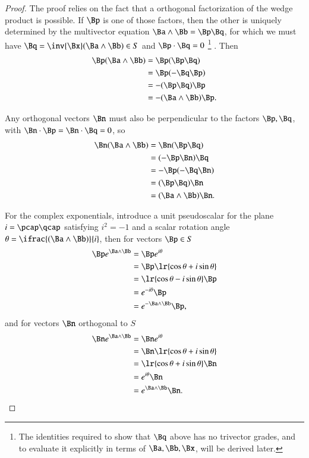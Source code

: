 \begin{proof}
The proof relies on the fact that a orthogonal factorization of the wedge product is possible.
If \( \Bp \) is one of those factors, then the other is uniquely determined by the multivector equation \( \Ba \wedge \Bb = \Bp \Bq \), for which we must have \( \Bq = \inv{\Bx}(\Ba \wedge \Bb) \in S \) and \( \Bp \cdot \Bq = 0 \)
\footnote{The identities required to show that \( \Bq \) above has no trivector grades, and to evaluate it explicitly in terms of \( \Ba, \Bb, \Bx \), will be derived later.}
.
Then
\begin{equation}\label{eqn:generalRotation:1780}
\begin{aligned}
\Bp (\Ba \wedge \Bb)
&= \Bp (\Bp \Bq) \\
&= \Bp (-\Bq \Bp) \\
&= -(\Bp \Bq) \Bp \\
&= -(\Ba \wedge \Bb) \Bp.
\end{aligned}
\end{equation}

Any orthogonal vectors \( \Bn \) must also be perpendicular to the factors \( \Bp, \Bq \), with \( \Bn \cdot \Bp = \Bn \cdot \Bq = 0 \), so
\begin{equation}\label{eqn:generalRotation:1800}
\begin{aligned}
\Bn (\Ba \wedge \Bb)
&= \Bn (\Bp \Bq) \\
&= (-\Bp \Bn) \Bq \\
&= -\Bp (-\Bq \Bn) \\
&= (\Bp \Bq) \Bn \\
&= (\Ba \wedge \Bb) \Bn.
\end{aligned}
\end{equation}

For the complex exponentials, introduce a unit pseudoscalar for the plane \( i = \pcap \qcap \) satisfying \( i^2 = -1 \) and a scalar rotation angle \( \theta = \ifrac{ (\Ba \wedge \Bb) }{i} \), then for vectors \( \Bp \in S \)
\begin{equation}\label{eqn:generalRotation:1840}
\begin{aligned}
\Bp e^{ \Ba \wedge \Bb }
&= \Bp e^{ i \theta } \\
&= \Bp \lr{ \cos\theta + i \sin\theta } \\
&= \lr{ \cos\theta - i \sin\theta } \Bp \\
&= e^{-i\theta} \Bp \\
&= e^{- \Ba \wedge \Bb} \Bp,
\end{aligned}
\end{equation}
and for vectors \( \Bn \) orthogonal to \( S \)
\begin{equation}\label{eqn:generalRotation:1860}
\begin{aligned}
\Bn e^{ \Ba \wedge \Bb }
&= \Bn e^{ i \theta } \\
&= \Bn \lr{ \cos\theta + i \sin\theta } \\
&= \lr{ \cos\theta + i \sin\theta } \Bn \\
&= e^{i\theta} \Bn \\
&= e^{\Ba \wedge \Bb} \Bn.
\end{aligned}
\end{equation}
\end{proof}
